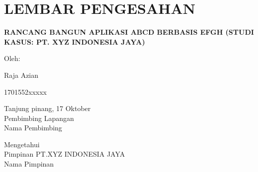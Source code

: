 \chapter*{\centering LEMBAR PENGESAHAN}

\thispagestyle{empty}


\begin{center}
    \textbf{RANCANG BANGUN APLIKASI ABCD BERBASIS EFGH (STUDI KASUS: PT. XYZ INDONESIA JAYA)}
\end{center}

\vspace{1cm}

\begin{center}
    Oleh:
    \begin{multicols}{2}
        {Raja Azian}

        {1701552xxxxx}
    \end{multicols}

    \vspace{1cm}

    Tanjung pinang, 17 Oktober \the\year{}\\
    Pembimbing Lapangan \\
    \vspace{2cm}
    Nama Pembimbing \\

    \vspace{2.75cm}

    Mengetahui\\
    Pimpinan PT.XYZ INDONESIA JAYA \\
    \vspace{2cm}
    Nama Pimpinan
\end{center}
\newpage